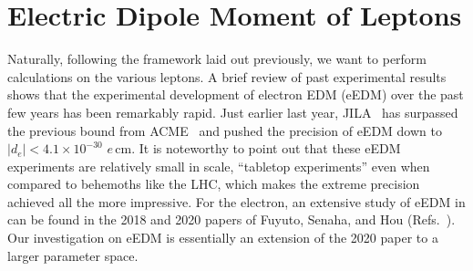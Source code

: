 \chapter{Electric Dipole Moment of Leptons}
\label{ch:leptonEDM}

Naturally, following the framework laid out previously, we want to perform calculations on the various leptons.
A brief review of past experimental results shows that the experimental development of electron EDM (eEDM) over the past few years has been remarkably rapid.
Just earlier last year, JILA~\cite{JILA23} has surpassed the previous bound from ACME~\cite{ACME18} and pushed the precision of eEDM down to \(|d_{e}| < 4.1 \times 10^{-30}\) \(e\,\mathrm{cm} \).
It is noteworthy to point out that these eEDM experiments are relatively small in scale, ``tabletop experiments'' even when compared to behemoths like the LHC, which makes the extreme precision achieved all the more impressive.
For the electron, an extensive study of eEDM in {\gthdm} can be found in the 2018 and 2020 papers of Fuyuto, Senaha, and Hou (Refs.~\cite{FSH20}).
Our investigation on eEDM is essentially an extension of the 2020 paper to a larger parameter space.

